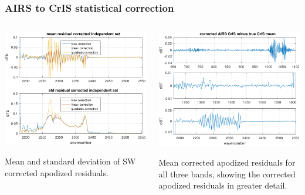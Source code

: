 \documentclass[10pt]{beamer}
\begin{document}
\begin{frame}
\frametitle{AIRS to CrIS statistical correction}
\begin{columns}[t]
\begin{column}{0.5\textwidth}  
  \begin{centering}
  \includegraphics[width=\textwidth]{figures/a2cris_regr_SW.pdf}
  \end{centering}\vspace{3mm}
  Mean and standard deviation of SW corrected apodized residuals.

\end{column}
\begin{column}{0.5\textwidth}
  \begin{centering}
  \includegraphics[width=\textwidth]{figures/ap_decon_corr.pdf}
  \end{centering}\vspace{3mm}
  Mean corrected apodized residuals for all three bands, showing
  the corrected apodized residuals in greater detail.
\end{column}
\end{columns}
\end{frame}
\end{document}
